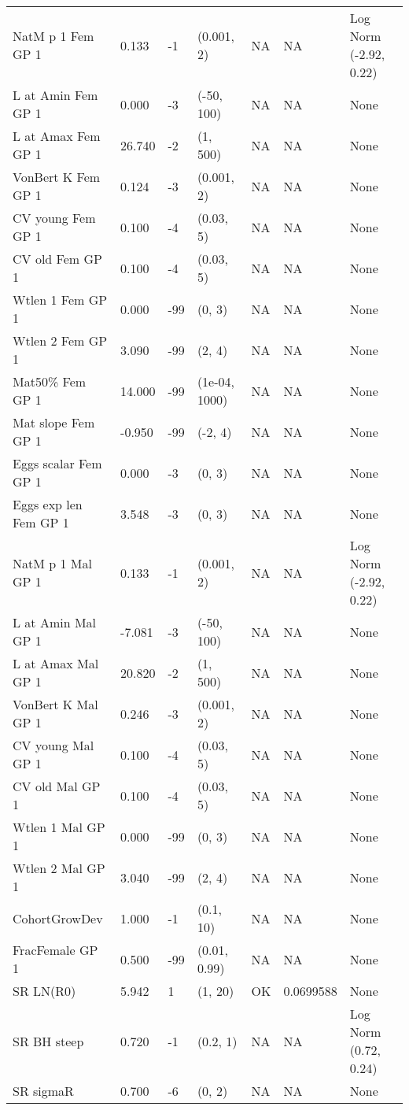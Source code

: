 \documentclass[11pt,
  english,
  a4paper,
]{article}
\begin{document}
\begin{landscape}
\begin{longtable}[t]{>{\raggedright\arraybackslash}p{6cm}lllll>{\raggedright\arraybackslash}p{4cm}}
\endfoot
\bottomrule
\endlastfoot
NatM p 1 Fem GP 1 & 0.133 & -1 & (0.001, 2) & NA & NA & Log Norm (-2.92, 0.22)\\
L at Amin Fem GP 1 & 0.000 & -3 & (-50, 100) & NA & NA & None\\
L at Amax Fem GP 1 & 26.740 & -2 & (1, 500) & NA & NA & None\\
VonBert K Fem GP 1 & 0.124 & -3 & (0.001, 2) & NA & NA & None\\
CV young Fem GP 1 & 0.100 & -4 & (0.03, 5) & NA & NA & None\\
CV old Fem GP 1 & 0.100 & -4 & (0.03, 5) & NA & NA & None\\
Wtlen 1 Fem GP 1 & 0.000 & -99 & (0, 3) & NA & NA & None\\
Wtlen 2 Fem GP 1 & 3.090 & -99 & (2, 4) & NA & NA & None\\
Mat50\% Fem GP 1 & 14.000 & -99 & (1e-04, 1000) & NA & NA & None\\
Mat slope Fem GP 1 & -0.950 & -99 & (-2, 4) & NA & NA & None\\
Eggs scalar Fem GP 1 & 0.000 & -3 & (0, 3) & NA & NA & None\\
Eggs exp len Fem GP 1 & 3.548 & -3 & (0, 3) & NA & NA & None\\
NatM p 1 Mal GP 1 & 0.133 & -1 & (0.001, 2) & NA & NA & Log Norm (-2.92, 0.22)\\
L at Amin Mal GP 1 & -7.081 & -3 & (-50, 100) & NA & NA & None\\
L at Amax Mal GP 1 & 20.820 & -2 & (1, 500) & NA & NA & None\\
VonBert K Mal GP 1 & 0.246 & -3 & (0.001, 2) & NA & NA & None\\
CV young Mal GP 1 & 0.100 & -4 & (0.03, 5) & NA & NA & None\\
CV old Mal GP 1 & 0.100 & -4 & (0.03, 5) & NA & NA & None\\
Wtlen 1 Mal GP 1 & 0.000 & -99 & (0, 3) & NA & NA & None\\
Wtlen 2 Mal GP 1 & 3.040 & -99 & (2, 4) & NA & NA & None\\
CohortGrowDev & 1.000 & -1 & (0.1, 10) & NA & NA & None\\
FracFemale GP 1 & 0.500 & -99 & (0.01, 0.99) & NA & NA & None\\
SR LN(R0) & 5.942 & 1 & (1, 20) & OK & 0.0699588 & None\\
SR BH steep & 0.720 & -1 & (0.2, 1) & NA & NA & Log Norm (0.72, 0.24)\\
SR sigmaR & 0.700 & -6 & (0, 2) & NA & NA & None\\

\end{longtable}
\end{landscape}
\end{document}
